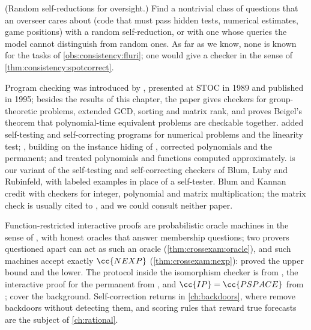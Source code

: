 \begin{refsection}
\begin{exercises}
\item \research (Random self-reductions for oversight.) Find a nontrivial class of questions that an overseer cares about (code that must pass hidden tests, numerical estimates, game positions) with a random self-reduction, or with one whose queries the model cannot distinguish from random ones. As far as we know, none is known for the tasks of \cref{obs:consistency:fluri}; one would give a checker in the sense of \cref{thm:consistency:spotcorrect}.\label{ex:consistency:rsr}
\end{exercises}

\notesandrefs
Program checking was introduced by \textcite{BlumKannan1995}, presented at STOC in 1989 and published in 1995; besides the results of this chapter, the paper gives checkers for group-theoretic problems, extended GCD, sorting and matrix rank, and proves Beigel's theorem that polynomial-time equivalent problems are checkable together. \Textcite{BlumLubyRubinfeld1993} added self-testing and self-correcting programs for numerical problems and the linearity test; \textcite{Lipton1991}, building on the instance hiding of \textcite{BeaverFeigenbaum1990}, corrected polynomials and the permanent; and \textcite{GemmellEtAl1991} treated polynomials and functions computed approximately.  is our variant of the self-testing and self-correcting checkers of Blum, Luby and Rubinfeld, with labeled examples in place of a self-tester. Blum and Kannan credit \textcite{Freivalds1979} with checkers for integer, polynomial and matrix multiplication; the matrix check is usually cited to \textcite{Freivalds1977}, and we could consult neither paper.

Function-restricted interactive proofs are probabilistic oracle machines in the sense of \textcite{FortnowRompelSipser1994}, with honest oracles that answer membership questions; two provers questioned apart can act as such an oracle (\cref{thm:crossexam:oracle}), and such machines accept exactly $\cc{NEXP}$ (\cref{thm:crossexam:nexp}): \textcite{FortnowRompelSipser1994} proved the upper bound and \textcite{BabaiFortnowLund1991} the lower. The protocol inside the isomorphism checker is from \textcite{GoldreichMicaliWigderson1991}, the interactive proof for the permanent from \textcite{LundEtAl1992}, and $\cc{IP}=\cc{PSPACE}$ from \textcite{Shamir1992}; \textcite{AroraBarak2009} cover the background. Self-correction returns in \cref{ch:backdoors}, where \textcite{GoldwasserEtAl2025} remove backdoors without detecting them, and scoring rules that reward true forecasts are the subject of \cref{ch:rational}.


\end{refsection}
